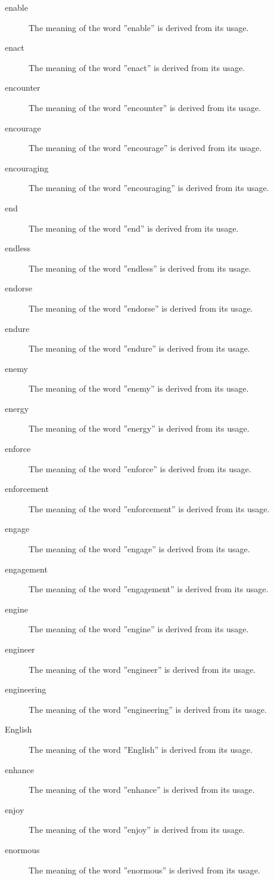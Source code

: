 \documentclass[12pt, letterpaper]{memoir}
\begin{document}
\begin{description}
\item[enable] The meaning of the word ''enable'' is derived from its usage.
\item[enact] The meaning of the word ''enact'' is derived from its usage.
\item[encounter] The meaning of the word ''encounter'' is derived from its usage.
\item[encourage] The meaning of the word ''encourage'' is derived from its usage.
\item[encouraging] The meaning of the word ''encouraging'' is derived from its usage.
\item[end] The meaning of the word ''end'' is derived from its usage.
\item[endless] The meaning of the word ''endless'' is derived from its usage.
\item[endorse] The meaning of the word ''endorse'' is derived from its usage.
\item[endure] The meaning of the word ''endure'' is derived from its usage.
\item[enemy] The meaning of the word ''enemy'' is derived from its usage.
\item[energy] The meaning of the word ''energy'' is derived from its usage.
\item[enforce] The meaning of the word ''enforce'' is derived from its usage.
\item[enforcement] The meaning of the word ''enforcement'' is derived from its usage.
\item[engage] The meaning of the word ''engage'' is derived from its usage.
\item[engagement] The meaning of the word ''engagement'' is derived from its usage.
\item[engine] The meaning of the word ''engine'' is derived from its usage.
\item[engineer] The meaning of the word ''engineer'' is derived from its usage.
\item[engineering] The meaning of the word ''engineering'' is derived from its usage.
\item[English] The meaning of the word ''English'' is derived from its usage.
\item[enhance] The meaning of the word ''enhance'' is derived from its usage.
\item[enjoy] The meaning of the word ''enjoy'' is derived from its usage.
\item[enormous] The meaning of the word ''enormous'' is derived from its usage.

\end{description}
\end{document}
